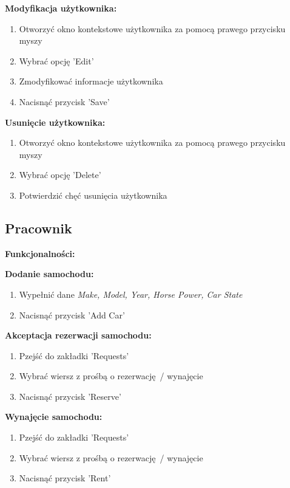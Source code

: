 \documentclass{article}
\begin{document}
\textbf{Modyfikacja użytkownika:}

\begin{enumerate}
    \item Otworzyć okno kontekstowe użytkownika za pomocą prawego przycisku myszy
    \item Wybrać opcję 'Edit'
    \item Zmodyfikować informacje użytkownika
    \item Nacisnąć przycisk 'Save'
\end{enumerate}

\textbf{Usunięcie użytkownika:}

\begin{enumerate}
    \item Otworzyć okno kontekstowe użytkownika za pomocą prawego przycisku myszy
    \item Wybrać opcję 'Delete'
    \item Potwierdzić chęć usunięcia użytkownika
\end{enumerate}

\subsection{Pracownik}
\vspace{1em}

\textbf{Funkcjonalności:}
\vspace{1em}

\textbf{Dodanie samochodu:}

\begin{enumerate}
    \item Wypełnić dane \textit{Make, Model, Year, Horse Power, Car State}
    \item Nacisnąć przycisk 'Add Car'
\end{enumerate}

\textbf{Akceptacja rezerwacji samochodu:}

\begin{enumerate}
    \item Pzejść do zakładki 'Requests'
    \item Wybrać wiersz z prośbą o rezerwację / wynajęcie
    \item Nacisnąć przycisk 'Reserve'
\end{enumerate}

\textbf{Wynajęcie samochodu:}

\begin{enumerate}
    \item Pzejść do zakładki 'Requests'
    \item Wybrać wiersz z prośbą o rezerwację / wynajęcie
    \item Nacisnąć przycisk 'Rent'
\end{enumerate}
\end{document}

